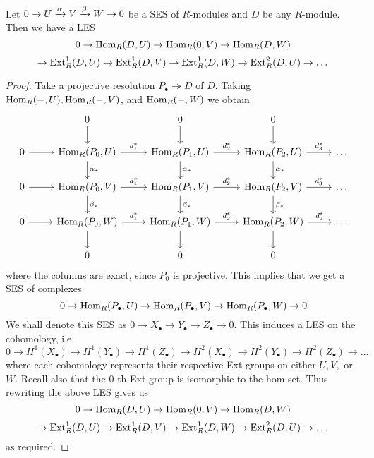 \begin{thm}
    Let $0\to U \xrightarrow{\alpha} V \xrightarrow{\beta} W \to 0$ be a SES of $R$-modules and $D$ be any $R$-module. Then we have a LES 
    \[0 \to \operatorname{Hom}_R(D,U) \to \operatorname{Hom}_R(0,V)\to \operatorname{Hom}_R(D,W)\]
    \[\to \operatorname{Ext}_R^1 (D,U)\to \operatorname{Ext}_R^1(D,V)\to \operatorname{Ext}_R^1(D,W)\to \operatorname{Ext}_R^2(D,U)\to \dots\]
\end{thm}
\begin{proof}
    Take a projective resolution $P_\bullet \twoheadrightarrow D$ of $D$. Taking $\operatorname{Hom}_R(-, U), \operatorname{Hom}_R(-, V)$, and $\operatorname{Hom}_R(-, W)$ we obtain
    \[\begin{tikzcd}[sep=small]
	&& 0 && 0 && 0 \\
	\\
	0 && {\h_R(P_0, U)} && {\h_R(P_1, U)} && {\h_R(P_2, U)} && \dots \\
	\\
	0 && {\h_R(P_0, V)} && {\h_R(P_1, V)} && {\h_R(P_2, V)} && \dots \\
	\\
	0 && {\h_R(P_0, W)} && {\h_R(P_1, W)} && {\h_R(P_2, W)} && \dots \\
	\\
	&& 0 && 0 && 0
	\arrow[from=1-3, to=3-3]
	\arrow[from=1-5, to=3-5]
	\arrow[from=1-7, to=3-7]
	\arrow[from=3-1, to=3-3]
	\arrow["{d_1^*}", from=3-3, to=3-5]
	\arrow["{\alpha_*}", from=3-3, to=5-3]
	\arrow["{d_2^*}", from=3-5, to=3-7]
	\arrow["{\alpha_*}", from=3-5, to=5-5]
	\arrow["{d_3^*}", from=3-7, to=3-9]
	\arrow["{\alpha_*}", from=3-7, to=5-7]
	\arrow[from=5-1, to=5-3]
	\arrow["{d_1^*}", from=5-3, to=5-5]
	\arrow["{\beta_*}", from=5-3, to=7-3]
	\arrow["{d_2^*}", from=5-5, to=5-7]
	\arrow["{\beta_*}", from=5-5, to=7-5]
	\arrow["{d_3^*}", from=5-7, to=5-9]
	\arrow["{\beta_*}", from=5-7, to=7-7]
	\arrow[from=7-1, to=7-3]
	\arrow["{d_1^*}", from=7-3, to=7-5]
	\arrow[from=7-3, to=9-3]
	\arrow["{d_2^*}", from=7-5, to=7-7]
	\arrow[from=7-5, to=9-5]
	\arrow["{d_3^*}", from=7-7, to=7-9]
	\arrow[from=7-7, to=9-7]
    \end{tikzcd}\]
    where the columns are exact, since $P_0$ is projective. This implies that we get a SES of complexes
    \[0 \to \operatorname{Hom}_R(P_\bullet, U) \to \operatorname{Hom}_R(P_\bullet, V)\to \operatorname{Hom}_R(P_\bullet, W)\to 0\]
    We shall denote this SES as $0 \to X_\bullet \to Y_\bullet \to Z_\bullet \to 0$. This induces a LES on the cohomology, i.e.
    \[0 \to H^1(X_\bullet) \to H^1(Y_\bullet) \to H^1(Z_\bullet) \to H^2(X_\bullet) \to H^2(Y_\bullet) \to H^2(Z_\bullet) \to \dots\]
    where each cohomology represents their respective Ext groups on either $U,V,$ or $W$. Recall also that the $0$-th Ext group is isomorphic to the hom set. Thus rewriting the above LES gives us
    \[0 \to \operatorname{Hom}_R(D,U) \to \operatorname{Hom}_R(0,V)\to \operatorname{Hom}_R(D,W)\]
    \[\to \operatorname{Ext}_R^1 (D,U)\to \operatorname{Ext}_R^1(D,V)\to \operatorname{Ext}_R^1(D,W)\to \operatorname{Ext}_R^2(D,U)\to \dots\]
    as required.
\end{proof}

